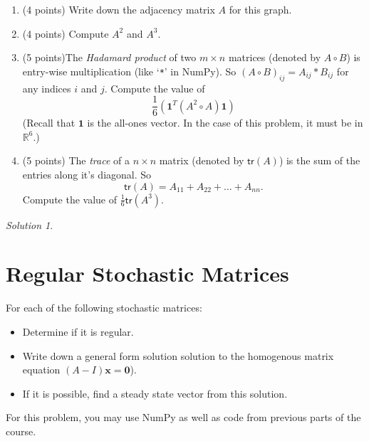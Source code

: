 \documentclass{article}
\theoremstyle{remark}
\newtheorem*{solution}{Solution}
\begin{document}
\begin{enumerate}
\item (4 points) Write down the adjacency matrix $A$ for this graph.
\item (4 points) Compute $A^2$ and $A^3$.
\item (5 points)The \textit{Hadamard product} of two $m \times n$ matrices (denoted by $A \circ B$) is entry-wise multiplication (like `\texttt{*}' in NumPy).
  So $(A \circ B)_{ij} = A_{ij} * B_{ij}$ for any indices $i$ and $j$.
  Compute the value of
  \begin{displaymath}
    \frac 1 6 \left(\mathbf 1^T (A^2 \circ A) \mathbf 1\right)
  \end{displaymath}
  (Recall that $\mathbf 1$ is the all-ones vector.
  In the case of this problem, it must be in $\mathbb R^6$.)
\item (5 points) The \textit{trace} of a $n \times n$ matrix (denoted by $\mathsf{tr}(A)$) is the sum of the entries along it's diagonal. So
  \begin{displaymath}
    \mathsf{tr}(A) = A_{11} + A_{22} + \dots + A_{nn}.
  \end{displaymath}
  Compute the value of $\frac 1 6 \mathsf{tr}(A^3)$.
\end{enumerate}
\vfill

\pagebreak
\begin{solution}
\end{solution}

\pagebreak
\section{Regular Stochastic Matrices}
For each of the following stochastic matrices:
\begin{itemize}
\item
  Determine if it is regular.
\item
  Write down a general form solution solution to the homogenous matrix equation $(A - I)\mathbf x = \mathbf 0$).
\item
  If it is possible, find a steady state vector from this solution.
\end{itemize}
For this problem, you may use NumPy as well as code from previous parts of the course.
\end{document}
